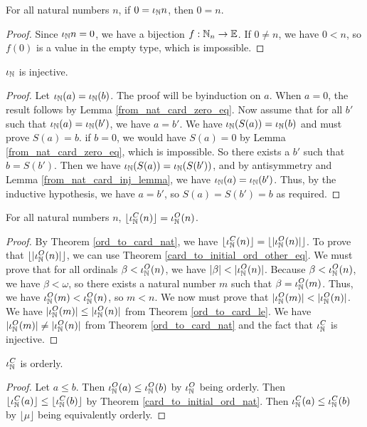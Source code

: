 \documentclass[../../math.tex]{subfiles}
\begin{document}
\begin{lemma} \label{from_nat_card_zero_eq}
    For all natural numbers $n$, if $0 = \iota_{\mathbb{N}} n$, then $0 = n$.
\end{lemma}
\begin{proof}
    Since $\iota_{\mathbb{N}} n = 0$, we have a bijection $f : \mathbb{N}_n \to \mathbb{E}$.  If $0 \neq n$, we
    have $0 < n$, so $f(0)$ is a value in the empty type, which is impossible.
\end{proof}

\begin{instance}
    $\iota_{\mathbb{N}}$ is injective.
\end{instance}
\begin{proof}
    Let $\iota_{\mathbb{N}}(a) = \iota_{\mathbb{N}}(b)$.  The proof will be byinduction on $a$.  When $a = 0$,
    the result follows by Lemma \ref{from_nat_card_zero_eq}.  Now assume that
    for all $b'$ such that $\iota_{\mathbb{N}}(a) = \iota_{\mathbb{N}}(b')$, we have $a = b'$.  We have
    $\iota_{\mathbb{N}}(S(a)) = \iota_{\mathbb{N}}(b)$ and must prove $S(a) = b$.  if $b = 0$, we would have
    $S(a) = 0$ by Lemma \ref{from_nat_card_zero_eq}, which is impossible.  So
    there exists a $b'$ such that $b = S(b')$.  Then we have $\iota_{\mathbb{N}}(S(a)) =
    \iota_{\mathbb{N}}(S(b'))$, and by antisymmetry and Lemma \ref{from_nat_card_inj_lemma}, we
    have $\iota_{\mathbb{N}}(a) = \iota_{\mathbb{N}}(b')$.  Thus, by the inductive hypothesis, we have $a =
    b'$, so $S(a) = S(b') = b$ as required.
\end{proof}

\begin{theorem} \label{card_to_initial_ord_nat}
    For all natural numbers $n$, $\lfloor \iota_{\mathbb{N}}^C(n) \rfloor = \iota_{\mathbb{N}}^O(n)$.
\end{theorem}
\begin{proof}
    By Theorem \ref{ord_to_card_nat}, we have $\lfloor \iota_{\mathbb{N}}^C(n) \rfloor =
    \lfloor | \iota_{\mathbb{N}}^O(n) | \rfloor$.  To prove that $\lfloor | \iota_{\mathbb{N}}^O(n) |
    \rfloor$, we can use Theorem \ref{card_to_initial_ord_other_eq}.  We must
    prove that for all ordinals $\beta < \iota_{\mathbb{N}}^O(n)$, we have $|\beta| <
    |\iota_{\mathbb{N}}^O(n)|$.  Because $\beta < \iota_{\mathbb{N}}^O(n)$, we have $\beta < \omega$, so there
    exists a natural number $m$ such that $\beta = \iota_{\mathbb{N}}^O(m)$.  Thus, we have
    $\iota_{\mathbb{N}}^O(m) < \iota_{\mathbb{N}}^O(n)$, so $m < n$.  We now must prove that $|\iota_{\mathbb{N}}^O(m)| <
    |\iota_{\mathbb{N}}^O(n)|$.  We have $|\iota_{\mathbb{N}}^O(m)| \leq |\iota_{\mathbb{N}}^O(n)|$ from Theorem
    \ref{ord_to_card_le}.  We have $|\iota_{\mathbb{N}}^O(m)| \neq |\iota_{\mathbb{N}}^O(n)|$ from Theorem
    \ref{ord_to_card_nat} and the fact that $\iota_{\mathbb{N}}^C$ is injective.
\end{proof}

\begin{instance}
    $\iota_{\mathbb{N}}^C$ is orderly.
\end{instance}
\begin{proof}
    Let $a \leq b$.  Then $\iota_{\mathbb{N}}^O(a) \leq \iota_{\mathbb{N}}^O(b)$ by $\iota_{\mathbb{N}}^O$ being orderly.
    Then $\lfloor \iota_{\mathbb{N}}^C(a) \rfloor \leq \lfloor \iota_{\mathbb{N}}^C(b) \rfloor$ by Theorem
    \ref{card_to_initial_ord_nat}.  Then $\iota_{\mathbb{N}}^C(a) \leq \iota_{\mathbb{N}}^C(b)$ by $\lfloor
    \mu \rfloor$ being equivalently orderly.
\end{proof}
\end{document}
